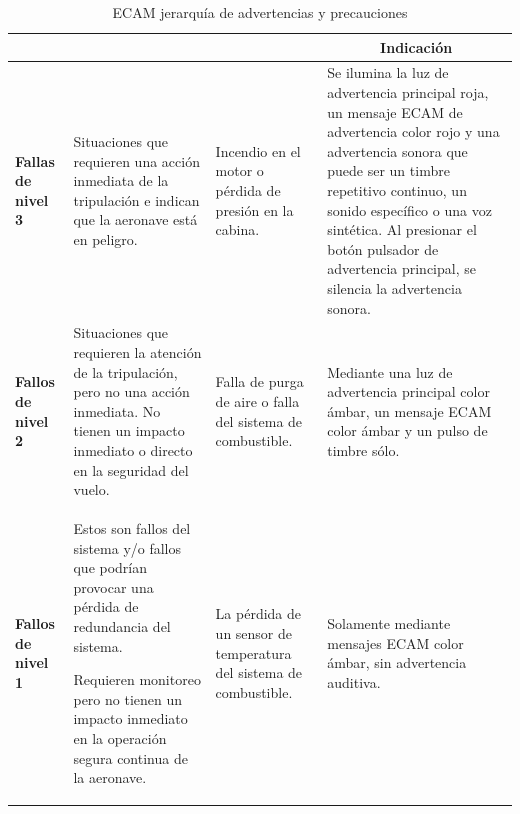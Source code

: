 \begin{table}[!h]
 \centering
 \caption{ECAM jerarqu\'ia de advertencias y precauciones}
 \label{tab:01.ecam.jerarquia.de.advertencias.y.precauciones}

  \begin{tabular}{m{}m{}m{}m{}} \hline \rowcolor{cyan!20}
\centering {\bf Jerarqu\'ia} & \centering {\bf Descripci\'on} & \centering {\bf Ejemplo} & \multicolumn{1}{c}{\bf Indicaci\'on} \\ \hline \rowcolor{red}

  \centering \textbf{Fallas de nivel 3} & {\scriptsize Situaciones que requieren una acción inmediata de la tripulación e indican que la aeronave está en peligro. }

& {\scriptsize Incendio en el motor o pérdida de presión en la cabina. }

& {\scriptsize Se ilumina la luz de advertencia principal roja, un mensaje ECAM de advertencia color rojo y una advertencia sonora que puede ser un timbre repetitivo continuo, un sonido específico o una voz sintética. Al presionar el botón pulsador de advertencia principal, se silencia la advertencia sonora.} \\ \rowcolor{amber}

  \centering \textbf{Fallos de nivel 2} & {\scriptsize Situaciones que requieren la atención de la tripulación, pero no una acción inmediata. No tienen un impacto inmediato o directo en la seguridad del vuelo. } 

& {\scriptsize Falla de purga de aire o falla del sistema de combustible. }

&{\scriptsize Mediante una luz de advertencia principal color ámbar, un mensaje ECAM color ámbar y un pulso de timbre s\'olo.} \\ \hline \rowcolor{amber}

   \centering \textbf{Fallos de nivel 1} & {\scriptsize Estos son fallos del sistema y/o fallos que podrían provocar una pérdida de redundancia del sistema.

 Requieren monitoreo pero no tienen un impacto inmediato en la operación segura continua de la aeronave. }

&{\scriptsize La pérdida de un sensor de temperatura del sistema de combustible. }

&{\scriptsize Solamente mediante mensajes ECAM color ámbar, sin advertencia auditiva.} \\ \hline
    
  \end{tabular}
\end{table}




